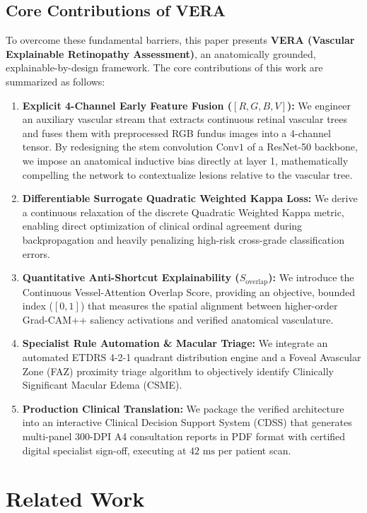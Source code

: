 \documentclass[conference]{IEEEtran}
\begin{document}
\subsection{Core Contributions of VERA}
To overcome these fundamental barriers, this paper presents \textbf{VERA (Vascular Explainable Retinopathy Assessment)}, an anatomically grounded, explainable-by-design framework. The core contributions of this work are summarized as follows:
\begin{enumerate}
    \item \textbf{Explicit 4-Channel Early Feature Fusion ($[R, G, B, V]$):} We engineer an auxiliary vascular stream that extracts continuous retinal vascular trees and fuses them with preprocessed RGB fundus images into a 4-channel tensor. By redesigning the stem convolution $\text{Conv1}$ of a ResNet-50 backbone, we impose an anatomical inductive bias directly at layer 1, mathematically compelling the network to contextualize lesions relative to the vascular tree.
    \item \textbf{Differentiable Surrogate Quadratic Weighted Kappa Loss:} We derive a continuous relaxation of the discrete Quadratic Weighted Kappa metric, enabling direct optimization of clinical ordinal agreement during backpropagation and heavily penalizing high-risk cross-grade classification errors.
    \item \textbf{Quantitative Anti-Shortcut Explainability ($S_{\text{overlap}}$):} We introduce the Continuous Vessel-Attention Overlap Score, providing an objective, bounded index ($[0, 1]$) that measures the spatial alignment between higher-order Grad-CAM++ saliency activations and verified anatomical vasculature.
    \item \textbf{Specialist Rule Automation \& Macular Triage:} We integrate an automated ETDRS 4-2-1 quadrant distribution engine and a Foveal Avascular Zone (FAZ) proximity triage algorithm to objectively identify Clinically Significant Macular Edema (CSME).
    \item \textbf{Production Clinical Translation:} We package the verified architecture into an interactive Clinical Decision Support System (CDSS) that generates multi-panel 300-DPI A4 consultation reports in PDF format with certified digital specialist sign-off, executing at $42\text{ ms}$ per patient scan.
\end{enumerate}

\section{Related Work}
\end{document}
